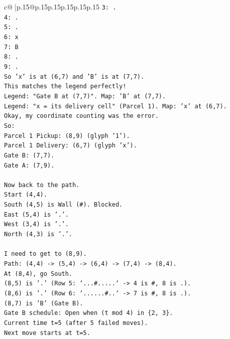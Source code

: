 \documentclass{article}
\begin{document}
{\begin{supertabular}{c@{$\;$}|p{.15\linewidth}@{}p{.15\linewidth}p{.15\linewidth}p{.15\linewidth}p{.15\linewidth}p{.15\linewidth}}
{{{\texttt{3: .} \\
\texttt{4: .} \\
\texttt{5: .} \\
\texttt{6: x} \\
\texttt{7: B} \\
\texttt{8: .} \\
\texttt{9: .} \\
\texttt{So 'x' is at (6,7) and 'B' is at (7,7).} \\
\texttt{This matches the legend perfectly!} \\
\texttt{Legend: "Gate B at (7,7)". Map: 'B' at (7,7).} \\
\texttt{Legend: "x = its delivery cell" (Parcel 1). Map: 'x' at (6,7).} \\
\texttt{Okay, my coordinate counting was the error.} \\
\texttt{So:} \\
\texttt{Parcel 1 Pickup: (8,9) (glyph '1').} \\
\texttt{Parcel 1 Delivery: (6,7) (glyph 'x').} \\
\texttt{Gate B: (7,7).} \\
\texttt{Gate A: (7,9).} \\
\\ 
\texttt{Now back to the path.} \\
\texttt{Start (4,4).} \\
\texttt{South (4,5) is Wall (\#). Blocked.} \\
\texttt{East (5,4) is '.'.} \\
\texttt{West (3,4) is '.'.} \\
\texttt{North (4,3) is '.'.} \\
\\ 
\texttt{I need to get to (8,9).} \\
\texttt{Path: (4,4) {-}> (5,4) {-}> (6,4) {-}> (7,4) {-}> (8,4).} \\
\texttt{At (8,4), go South.} \\
\texttt{(8,5) is '.' (Row 5: `...\#.....` {-}> 4 is \#, 8 is .).} \\
\texttt{(8,6) is '.' (Row 6: `......\#..` {-}> 7 is \#, 8 is .).} \\
\texttt{(8,7) is 'B' (Gate B).} \\
\texttt{Gate B schedule: Open when (t mod 4) in \{2, 3\}.} \\
\texttt{Current time t=5 (after 5 failed moves).} \\
\texttt{Next move starts at t=5.} \\
}}}
\end{supertabular}}
\end{document}
